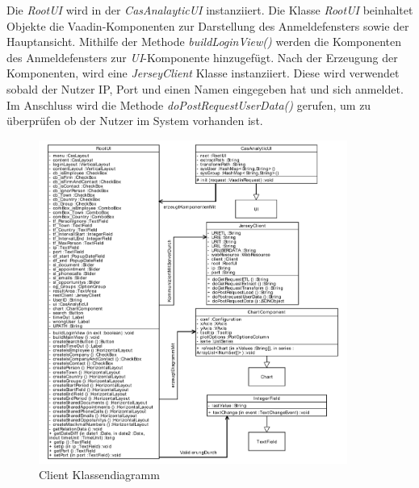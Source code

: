 Die \textit{RootUI} wird in der \textit{CasAnalayticUI} instanziiert. Die Klasse \textit{RootUI} beinhaltet Objekte die Vaadin-Komponenten zur Darstellung des Anmeldefensters sowie der Hauptansicht. Mithilfe der Methode \textit{buildLoginView()} werden die Komponenten des Anmeldefensters zur \textit{UI}-Komponente hinzugefügt. Nach der Erzeugung der Komponenten, wird eine \textit{JerseyClient} Klasse instanziiert. Diese wird verwendet sobald der Nutzer IP, Port und einen Namen eingegeben hat und sich anmeldet. Im Anschluss wird die Methode \textit{doPostRequestUserData()} gerufen, um zu überprüfen ob der Nutzer im System vorhanden ist. 

\begin{figure}[htbp]
\begin{center}
\includegraphics[width=0.9\textwidth]{pics/ClientKlassendiagramm.pdf}
\caption{Client Klassendiagramm}
\label{umsetzung_klassendiagramm_client}
\end{center}
\end{figure}

\newpage

